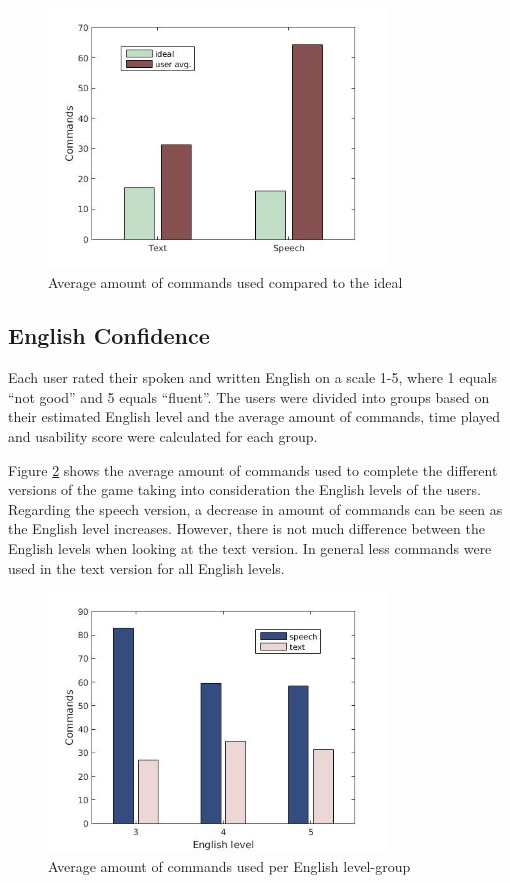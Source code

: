 \begin{figure}[ht]
  \centering
  \includegraphics[width=0.8\textwidth]{images/ideal_cmd.jpg}
  \caption{Average amount of commands used compared to the ideal}\label{ideal_cmd}
\end{figure}

\newpage
\subsection{English Confidence} \label{sec:eng_con}
Each user rated their spoken and written English on a scale 1-5, where 1 equals ``not good'' and 5 equals ``fluent''. The users were divided into groups based on their estimated English level and the average amount of commands, time played and usability score were calculated for each group.

Figure \ref{eng_cmd} shows the average amount of commands used to complete the different versions of the game taking into consideration the English levels of the users. Regarding the speech version, a decrease in amount of commands can be seen as the English level increases. However, there is not much difference between the English levels when looking at the text version. In general less commands were used in the text version for all English levels.

\begin{figure}[ht]
  \centering
  \includegraphics[width=0.8\textwidth]{images/english_cmd.jpg}
  \caption{Average amount of commands used per English level-group}\label{eng_cmd}
\end{figure}

